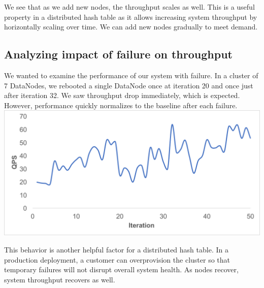 \documentclass[paper=a4,fontsize=11pt]{report} %
\numberwithin{equation}{section} %
\numberwithin{figure}{section} %
\numberwithin{table}{section} %
\begin{document}
We see that as we add new nodes, the throughput scales as well. This is a useful property in a distributed hash table as it allows increasing system throughput by horizontally scaling over time. We can add new nodes gradually to meet demand.

\subsection{Analyzing impact of failure on throughput}
We wanted to examine the performance of our system with failure. In a cluster of 7 DataNodes, we rebooted a single DataNode once at iteration 20 and once just after iteration 32. We saw throughput drop immediately, which is expected. However, performance quickly normalizes to the baseline after each failure.\\

\noindent\includegraphics[width=\textwidth]{throughput_failiure.png}

This behavior is another helpful factor for a distributed hash table. In a production deployment, a customer can overprovision the cluster so that temporary failures will not disrupt overall system health. As nodes recover, system throughput recovers as well.
\end{document}
